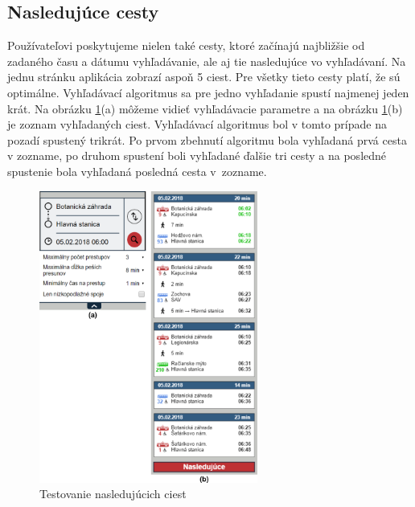\subsection{Nasledujúce cesty}
Používateľovi poskytujeme nielen také cesty, ktoré začínajú najbližšie od zadaného času a dátumu vyhľadávanie, ale aj tie nasledujúce vo vyhľadávaní. Na jednu stránku aplikácia zobrazí aspoň 5 ciest. Pre všetky tieto cesty platí, že sú optimálne. Vyhľadávací algoritmus sa pre jedno vyhľadanie spustí najmenej jeden krát. Na obrázku \ref{fig:test-next-paths}(a) môžeme vidieť vyhľadávacie parametre a na obrázku \ref{fig:test-next-paths}(b) je zoznam vyhľadaných ciest. Vyhľadávací algoritmus bol v tomto prípade na pozadí spustený trikrát. Po prvom zbehnutí algoritmu bola vyhľadaná prvá cesta v zozname, po druhom spustení boli vyhľadané ďalšie tri cesty a na posledné spustenie bola vyhľadaná posledná cesta v~zozname.

\begin{figure}[H]
\centerline{\includegraphics[width=0.64\textwidth]{images/test/next-paths-1}}
\caption[Testovanie nasledujúcich ciest]{Testovanie nasledujúcich ciest}
\label{fig:test-next-paths}
\end{figure}



